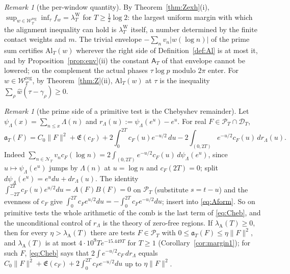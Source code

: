 \documentclass[11pt]{amsart}
\theoremstyle{definition}
\theoremstyle{remark}
\newtheorem{remark}[theorem]{Remark}
\newcommand{\PT}{\mathcal P_T}
\newcommand{\lamW}{\lambda^{\mathrm W}_T}
\newcommand{\lamA}{\lambda_{\mathrm A}(T)}
\newcommand{\wh}{\widehat w}
\newcommand{\cF}{c_F}
\newcommand{\Lev}{\mathfrak E}
\newcommand{\Wcl}{\mathcal W_T}
\newcommand{\NT}{\mathcal N_T}
\newcommand{\Aconst}{\mathsf A_T}
\begin{document}
\begin{remark}[the per-window quantity]\label{rem:excess}
By Theorem~\ref{thm:Zexh}(i), $\sup_{w\in\Wcl^{\mathrm{reg}}}\inf_\tau f_w=\lamW$ for $T\ge\frac12\log2$: the largest
uniform margin with which the alignment inequality can hold is $\lamW$ itself, a number determined by
the finite contact weights and $m$. The trivial envelope $-\sum_nv_n|w(\log n)|$ of the prime
sum certifies $\mathrm{Al}_T(w)$ wherever the right side of Definition~\ref{def:Al} is at most it, and by
Proposition~\ref{prop:env}(ii) the constant $\Aconst$ of that envelope cannot be lowered; on the complement the
actual phases $\tau\log p$ modulo $2\pi$ enter. For $w\in\Wcl^{\mathrm{reg}}$, by
Theorem~\ref{thm:Z}(ii), $\mathrm{Al}_T(w)$ at $\tau$ is the inequality $\sum_\rho\wh(\tau-\gamma_\rho)\ge0$.
\end{remark}

\begin{remark}[the prime side of a primitive test is the Chebyshev remainder]\label{rem:Cheb}
Let $\psi_\Lambda(x)=\sum_{n\le x}\Lambda(n)$ and $r_\Lambda(u):=\psi_\Lambda(e^u)-e^u$. For real $F\in\PT\cap\mathcal D_T$,
\begin{equation}\label{eq:Cheb}
\mathfrak a_T(F)=C_0\|F\|^2+\Lev(\cF)+2\int_0^{2T}\cF(u)e^{-u/2}\,du-2\int_{(0,2T)}e^{-u/2}\cF(u)\,dr_\Lambda(u).
\end{equation}
Indeed $\sum_{n\in\NT}v_n\cF(\log n)=2\int_{(0,2T)}e^{-u/2}\cF(u)\,d\psi_\Lambda(e^u)$, since $u\mapsto\psi_\Lambda(e^u)$
jumps by $\Lambda(n)$ at $u=\log n$ and $\cF(2T)=0$; split $d\psi_\Lambda(e^u)=e^udu+dr_\Lambda(u)$. The identity
$\int_{-2T}^{2T}\cF(u)e^{u/2}du=A(F)B(F)=0$ on $\PT$ (substitute $s=t-u$) and the evenness of $\cF$ give
$\int_0^{2T}\cF e^{u/2}du=-\int_0^{2T}\cF e^{-u/2}du$; insert into \eqref{eq:Aform}. So on primitive tests the whole
arithmetic of the comb is the last term of \eqref{eq:Cheb}, and the unconditional control of $r_\Lambda$ is the
theory of zero-free regions. If $\lamA\ge0$, then for every $\eta>\lamA$ there are tests $F\in\PT$ with
$0\le\mathfrak a_T(F)\le\eta\|F\|^2$, and $\lamA$ is at most $4\cdot10^9Te^{-15.449T}$ for $T\ge1$
(Corollary~\ref{cor:margin1}); for such $F$, \eqref{eq:Cheb} says that $2\int e^{-u/2}\cF\,dr_\Lambda$ equals
$C_0\|F\|^2+\Lev(\cF)+2\int_0^{2T}\cF e^{-u/2}du$ up to $\eta\|F\|^2$.
\end{remark}
\end{document}
